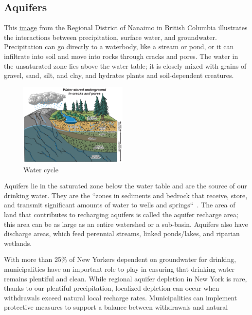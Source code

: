 \subsection*{Aquifers}\label{subsec:aquifers}
This \href{http://rdnwaterbudget.ca/water-101/aquifers-groundwater/}{image}
from the Regional District of Nanaimo in British Columbia 
illustrates the interactions between precipitation, surface water, and 
groundwater. Precipitation can go directly to a waterbody, like a stream or 
pond, or it can infiltrate into soil and move into rocks through cracks and 
pores. The water in the unsaturated zone lies above the water table; it is 
closely mixed with grains of gravel, sand, silt, and clay, and hydrates plants 
and soil-dependent creatures.
\par
\begin{figure}
    \includegraphics[width=0.48\textwidth]{images/aquifers.png}
    \vspace{-10pt}
    \caption{Water cycle}
    \vspace{-10pt}
\end{figure}
Aquifers lie in the saturated zone below the water table and are the source of 
our drinking water. They are the ``zones in sediments and bedrock that 
receive, store, and transmit significant amounts of water to wells and 
springs``~\citep{haeckel2014}. The area of land that contributes to recharging 
aquifers is called the aquifer recharge area; this area can be as large as an 
entire watershed or a sub-basin. Aquifers also have discharge areas, which feed 
perennial streams, linked ponds/lakes, and riparian wetlands.
\par
With more than 25\% of New Yorkers dependent on groundwater for drinking, 
municipalities have an important role to play in ensuring that drinking water 
remains plentiful and clean. While regional aquifer depletion in New York is 
rare, thanks to our plentiful precipitation, localized depletion can occur when 
withdrawals exceed natural local recharge rates. Municipalities can implement 
protective measures to support a balance between withdrawals and natural 
